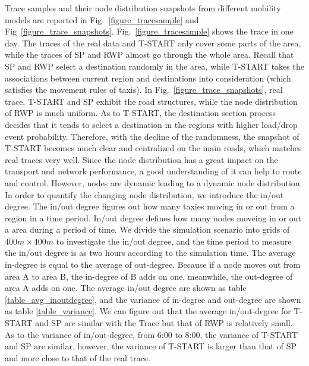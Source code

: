 Trace samples and their node distribution snapshots from different mobility models are reported in Fig.~\ref{figure_tracesample} and Fig~\ref{figure_trace_snapshots}. Fig.~\ref{figure_tracesample} shows the trace in one day. The traces of the real data and T-START only cover some parts of the area, while the traces of SP and RWP almost go through the whole area. Recall that SP and RWP select a destination randomly in the area, while T-START takes the associations between current region and destinations into consideration (which satisfies the movement rules of taxis). In Fig.~\ref{figure_trace_snapshots}, real trace, T-START and SP exhibit the road structures, while the node distribution of RWP is much uniform. As to T-START, the destination section process decides that it tends to select a destination in the regions with higher load/drop event probability. Therefore, with the decline of the randomness, the snapshot of T-START becomes much clear and centralized on the main roads, which matches real traces very well.
Since the node distribution has a great impact on the transport and network performance, a good understanding of it can help to route and control.  However, nodes are dynamic leading to a dynamic node distribution. In order to quantify the changing node distribution,  we introduce the in/out degree. The in/out degree figures out how many taxies moving in or out from a region in a time period. In/out degree defines how many nodes moveing in or out a area during a period of time. 
We divide the simulation scenario into grids of $ 400m \times 400 m$ to investigate the in/out degree, and the time period to measure the in/out degree is as two hours according to the simulation time. 
The average in-degree is equal to the average of out-degree. Because if a node moves out from area A to area B, the in-degree of B adds on one, meanwhile, the out-degree of area A adds on one. The average in/out degree are shown as table \ref{table_avg_inoutdegree}, and the variance of in-degree and out-degree are shown as table \ref{table_variance}.
We can figure out that the average in/out-degree for T-START and SP are similar with the Trace but that of RWP is relatively small. As to the variance of in/out-degree, from 6:00 to 8:00, the variance of T-START and SP are similar, however, the variance of T-START is larger than that of SP and more close to that of the real trace.  
